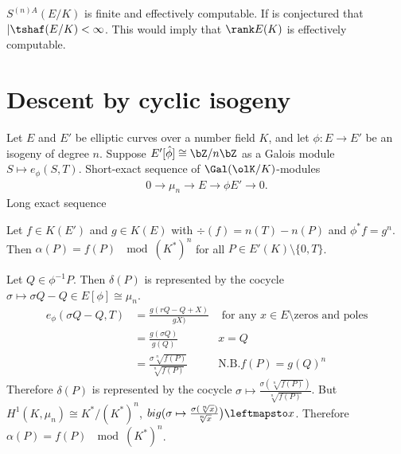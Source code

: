 \begin{rmk}
	$S^{(n)A}(E/K)$ is finite and effectively computable. If is conjectured that $|\tshaf(E/K) < \infty$. This would imply that $\rank E(K)$ is effectively computable.
\end{rmk}

\section{Descent by cyclic isogeny}
Let $E$ and $E'$ be elliptic curves over a number field $K$, and let $\phi:E\to E'$ be an isogeny of degree $n$. Suppose $E'[\hat{\phi}] \cong \bZ/n\bZ$ as a Galois module $S\mapsto e_\phi(S,T)$. Short-exact sequence of $\Gal(\olK/K)$-modules
\begin{align*}
	0\to \mu_n \to E\to{\phi} E' \to 0.
\end{align*}
Long exact sequence
\begin{center}
\end{center}
\begin{thm}
	Let $f \in K(E')$ and $g \in K(E)$ with $\div(f) = n(T) - n(P)$ and $\phi^*f = g^n$. Then $\alpha(P) = f(P) ~ \mod(K^*)^n$ for all $P \in E'(K) \setminus \{0,T\}$.
\end{thm}
\begin{prf}
	Let $Q \in \phi^{-1}P$. Then $\delta(P)$ is represented by the cocycle $\sigma \mapsto \sigma Q - Q \in E[\phi] \cong \mu_n$.
	\begin{align*}
		e_\phi(\sigma Q - Q, T) &= \frac{g(rQ - Q + X)}{gX)} &\text{ for any  } x\in E\setminus \text{zeros and poles} \\
							   &=  \frac{g(\sigma Q)}{g(Q)} & x = Q \\
							   &= \frac{\sigma \sqrt[n]{f(P)}}{\sqrt[n]{f(P)}} & \text{N.B.} f(P) = g(Q)^n
	\end{align*}
	Therefore $\delta(P)$ is represented by the cocycle $\sigma \mapsto \frac{\sigma(\sqrt[n]{f(P)})}{\sqrt[n]{f(P)}}$. But $H^1(K,\mu_n) \cong K^*/(K^*)^n$, $\\big(\sigma \mapsto \frac{\sigma(\sqrt[n]{x})}{ \sqrt[n]{x} }\big) \leftmapsto x$. Therefore $\alpha(P) = f(P) ~\mod(K^*)^n$.
\end{prf}

